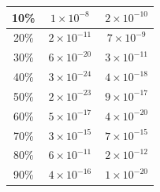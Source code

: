 \begin{table}[!ht]
\begin{center}
\begin{tabular}{|c|c|c|}
\hline
10\% & $^{\ }1\times10^{-8}$ & $^{\ }2\times10^{-10}$\\
\hline
20\% & $^{\ }2\times10^{-11}$ & $^{\ }7\times10^{-9}$\\
\hline
30\% & $^{\ }6\times10^{-20}$ & $^{\ }3\times10^{-11}$\\
\hline
40\% & $^{\ }3\times10^{-24}$ & $^{\ }4\times10^{-18}$\\
\hline
50\% & $^{\ }2\times10^{-23}$ & $^{\ }9\times10^{-17}$\\
\hline
60\% & $^{\ }5\times10^{-17}$ & $^{\ }4\times10^{-20}$\\
\hline
70\% & $^{\ }3\times10^{-15}$ & $^{\ }7\times10^{-15}$\\
\hline
80\% & $^{\ }6\times10^{-11}$ & $^{\ }2\times10^{-12}$\\
\hline
90\% & $^{\ }4\times10^{-16}$ & $^{\ }1\times10^{-20}$\\
\hline
\end{tabular}
\end{center}
\label{tab:proact-tautest-sup}
\end{table}

